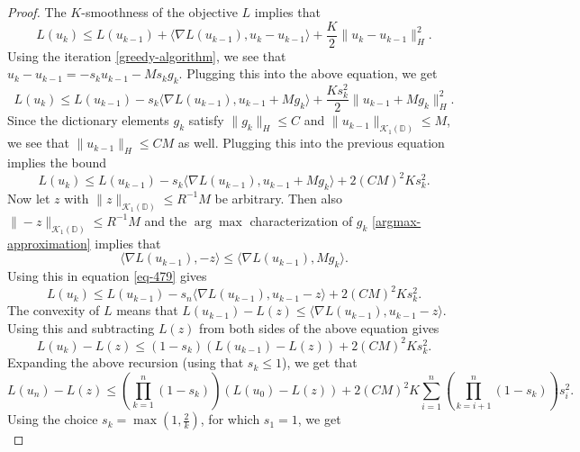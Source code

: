 \begin{proof}
 The $K$-smoothness of the objective $L$ implies that
 \begin{equation}
  L(u_k) \leq L(u_{k-1}) + \langle \nabla L(u_{k-1}), u_k - u_{k-1}\rangle + \frac{K}{2}\|u_k - u_{k-1}\|_H^2.
 \end{equation}
 Using the iteration \eqref{greedy-algorithm}, we see that $u_k - u_{k-1} = -s_ku_{k-1}-Ms_kg_k$. Plugging this into the above equation, we get
 \begin{equation}
  L(u_k) \leq L(u_{k-1}) - s_k\langle \nabla L(u_{k-1}), u_{k-1} + Mg_k\rangle + \frac{Ks_k^2}{2}\|u_{k-1} + Mg_k\|_H^2.
 \end{equation}
 Since the dictionary elements $g_k$ satisfy $\|g_k\|_H \leq C$ and $\|u_{k-1}\|_{\mathcal{K}_1(\mathbb{D})} \leq M$, we see that $\|u_{k-1}\|_H \leq CM$ as well. Plugging this into the previous equation implies the bound
 \begin{equation}\label{eq-479}
  L(u_k) \leq L(u_{k-1}) - s_k\langle \nabla L(u_{k-1}), u_{k-1} + Mg_k\rangle + 2(CM)^2Ks_k^2.
 \end{equation}
 Now let $z$ with $\|z\|_{\mathcal{K}_1(\mathbb{D})} \leq R^{-1}M$ be arbitrary. Then also $\|-z\|_{\mathcal{K}_1(\mathbb{D})} \leq R^{-1}M$ and the $\arg\max$ characterization of $g_k$ \eqref{argmax-approximation}  implies that
 \begin{equation}
  \langle \nabla L(u_{k-1}), -z\rangle \leq \langle \nabla L(u_{k-1}), Mg_k\rangle.
 \end{equation}
 Using this in equation \eqref{eq-479} gives
 \begin{equation}
  L(u_k) \leq L(u_{k-1}) - s_n\langle \nabla L(u_{k-1}), u_{k-1} - z\rangle + 2(CM)^2Ks_k^2.
 \end{equation}
 The convexity of $L$ means that $L(u_{k-1}) - L(z) \leq \langle \nabla L(u_{k-1}), u_{k-1} - z\rangle$. Using this and subtracting $L(z)$ from both sides of the above equation gives
 \begin{equation}
  L(u_k) - L(z) \leq (1 - s_k)(L(u_{k-1}) - L(z)) + 2(CM)^2Ks_k^2.
 \end{equation}
 Expanding the above recursion (using that $s_k\leq 1$), we get that
 \begin{equation}
  L(u_n) - L(z) \leq \left(\prod_{k=1}^n(1-s_k)\right)(L(u_0) - L(z)) + 2(CM)^2K\sum_{i=1}^n\left(\prod_{k=i+1}^n(1-s_k)\right)s_i^2.
 \end{equation}
 Using the choice $s_k = \max\left(1,\frac{2}{k}\right)$, for which $s_1 = 1$, we get
 \begin{equation}\label{eq-268}

\end{equation}
\end{proof}
